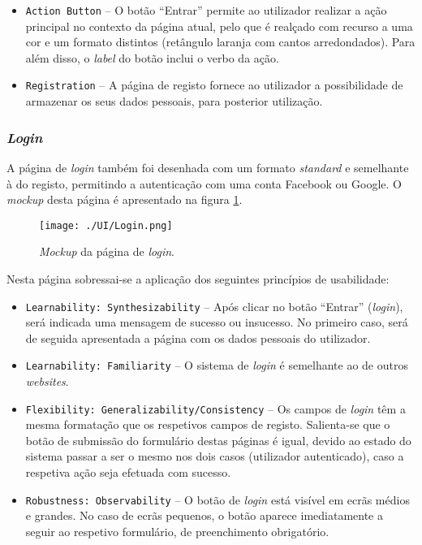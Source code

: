 \begin{itemize}
    \item \texttt{Action Button} -- O botão ``Entrar'' permite ao utilizador realizar a ação principal no contexto da página atual, pelo que é realçado com recurso a uma cor e um formato distintos (retângulo laranja com cantos arredondados). Para além disso, o \textit{label} do botão inclui o verbo da ação.

    \item \texttt{Registration} -- A página de registo fornece ao utilizador a possibilidade de armazenar os seus dados pessoais, para posterior utilização.
\end{itemize}


\subsubsection{\textit{Login}}

A página de \textit{login} também foi desenhada com um formato \textit{standard} e semelhante à do registo, permitindo a autenticação com uma conta Facebook ou Google. O \textit{mockup} desta página é apresentado na figura \ref{fig:login}.

\begin{figure}[H]
    \centering
    \texttt{[image: ./UI/Login.png]}
    \caption{\textit{Mockup} da página de \textit{login}.}
    \label{fig:login}
\end{figure}


Nesta página sobressai-se a aplicação dos seguintes princípios de usabilidade:

\begin{itemize}
    \item \texttt{Learnability: Synthesizability} -- Após clicar no botão ``Entrar'' (\textit{login}), será indicada uma mensagem de sucesso ou insucesso. No primeiro caso, será de seguida apresentada a página com os dados pessoais do utilizador.
    
    \item \texttt{Learnability: Familiarity} -- O sistema de \textit{login} é semelhante ao de outros \textit{websites}.
    
    \item \texttt{Flexibility: Generalizability/Consistency} -- Os campos de \textit{login} têm a mesma formatação que os respetivos campos de registo. Salienta-se que o botão de submissão do formulário destas páginas é igual, devido ao estado do sistema passar a ser o mesmo nos dois casos (utilizador autenticado), caso a respetiva ação seja efetuada com sucesso.
    
    \item \texttt{Robustness: Observability} --  O botão de \textit{login} está visível em ecrãs médios e grandes. No caso de ecrãs pequenos, o botão aparece imediatamente a seguir ao respetivo formulário, de preenchimento obrigatório.
\end{itemize}

